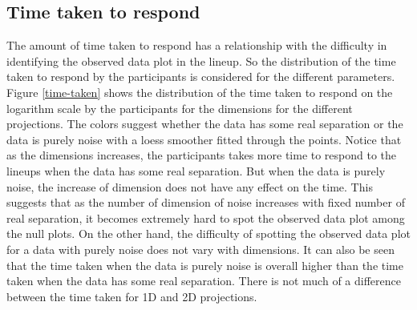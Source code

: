 \documentclass[12]{article}
\begin{document}

\subsection{Time taken to respond}

The amount of time taken to respond has a relationship with the difficulty in identifying the observed data plot in the lineup. So the distribution of the time taken to respond by the participants is considered for the different parameters. Figure \ref{time-taken} shows the distribution of the time taken to respond on the logarithm scale by the participants for the dimensions for the different projections. The colors suggest whether the data has some real separation or the data is purely noise with a loess smoother fitted through the points. Notice that as the dimensions increases, the participants  takes more time to respond to the lineups when the data has some real separation. But when the data is purely noise, the increase of dimension does not have any effect on the time. This suggests that as the number of dimension of noise increases with fixed number of real separation, it becomes extremely hard to spot the observed data plot among the null plots. On the other hand, the difficulty of spotting the observed data plot for a data with purely noise does not vary with dimensions. It can also be seen that the time taken when the data is purely noise is overall higher than the time taken when the data has some real separation. There is not much of a difference between the time taken for 1D and 2D projections.
\end{document}

